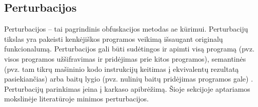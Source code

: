 \subsection{Perturbacijos}\label{sec:literature:perturbations}

Perturbacijos -- tai pagrindinis obfuskacijos metodas \ac{ae} kūrimui.
Perturbacijų tikslas yra pakeisti kenkėjiškos programos veikimą išsaugant
originalų funkcionalumą. Perturbacijos gali būti sudėtingos ir apimti visą
programą (pvz. visos programos užšifravimas ir pridėjimas prie kitos
programos), semantinės (pvz. tam tikrų mašininio kodo instrukcijų keitimas į
ekvivalentų rezultatą pasiekiančias) arba baitų lygio (pvz. nulinių baitų
pridėjimas programos gale) \citeplace. Perturbacijų parinkimas įeina į karkaso
apibrėžimą. Šioje sekcijoje aptariamos mokslinėje literatūroje minimos
perturbacijos.
